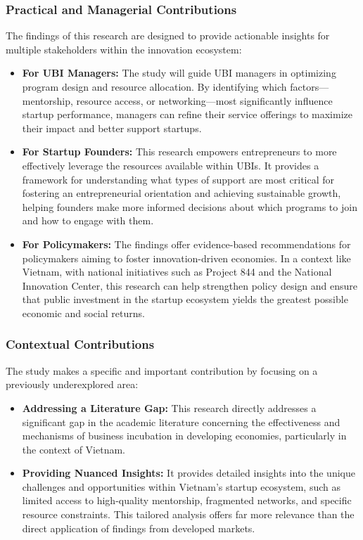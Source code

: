 \documentclass[../Main.tex]{subfiles}
\begin{document}
	\subsubsection{Practical and Managerial Contributions}
	
	The findings of this research are designed to provide actionable insights for multiple stakeholders within the innovation ecosystem:
	
	\begin{itemize}
		\item \textbf{For UBI Managers:} The study will guide UBI managers in optimizing program design and resource allocation. By identifying which factors—mentorship, resource access, or networking—most significantly influence startup performance, managers can refine their service offerings to maximize their impact and better support startups.
		
		\item \textbf{For Startup Founders:} This research empowers entrepreneurs to more effectively leverage the resources available within UBIs. It provides a framework for understanding what types of support are most critical for fostering an entrepreneurial orientation and achieving sustainable growth, helping founders make more informed decisions about which programs to join and how to engage with them.
		
		\item \textbf{For Policymakers:} The findings offer evidence-based recommendations for policymakers aiming to foster innovation-driven economies. In a context like Vietnam, with national initiatives such as Project 844 and the National Innovation Center, this research can help strengthen policy design and ensure that public investment in the startup ecosystem yields the greatest possible economic and social returns.
	\end{itemize}
	
	\subsubsection{Contextual Contributions}
	
	The study makes a specific and important contribution by focusing on a previously underexplored area:
	
	\begin{itemize}
		\item \textbf{Addressing a Literature Gap:} This research directly addresses a significant gap in the academic literature concerning the effectiveness and mechanisms of business incubation in developing economies, particularly in the context of Vietnam.
		
		\item \textbf{Providing Nuanced Insights:} It provides detailed insights into the unique challenges and opportunities within Vietnam's startup ecosystem, such as limited access to high-quality mentorship, fragmented networks, and specific resource constraints. This tailored analysis offers far more relevance than the direct application of findings from developed markets.
	\end{itemize}
	
\end{document}
